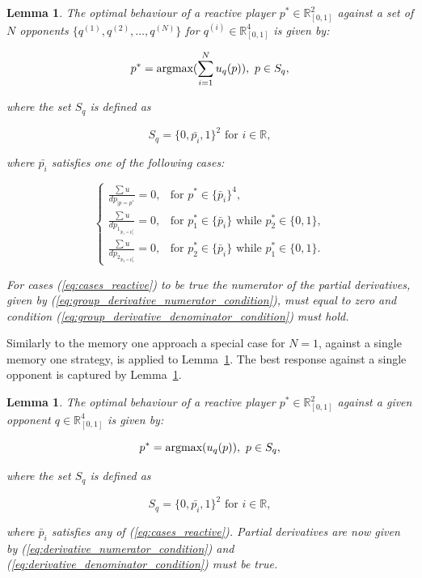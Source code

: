 \documentclass[10pt]{article}
\newcommand{\R}{\mathbb{R}}
\newtheorem{lemma}[theorem]{Lemma}
\begin{document}
\begin{lemma}\label{lemma:reactive_group_best_response}
    The optimal behaviour of a reactive player \(p^* \in \R_{[0, 1]} ^ 2\) against a set
    of \(N\) opponents \(\{q^{(1)}, q^{(2)}, \dots, q^{(N)} \}\) for \(q^{(i)} \in
    \R_{[0, 1]} ^ 4\) is given by:

    \[p^* = \textnormal{argmax}(\sum\limits_{i=1} ^ N  u_q(p)), \ p \in S_q,\]

    where the set \(S_q\) is defined as

    \[S_q = \{0, \bar{p_i}, 1 \} ^ 2 \text{ for } i \in \R,\]

    where \(\bar{p_i}\) satisfies one of the following cases:

    \begin{equation}\label{eq:cases_reactive}
        \left\{\begin{array}{lr}
        \frac{\sum u}{dp_{|p=p^*}} = 0, & \text{for } p^* \in \{\bar{p}_i\} ^ 4, \\
        \frac{\sum u}{dp_{1_{|p_1=p_1^*}}} = 0, & \text{for } p_1^* \in \{\bar{p}_i\}
        \text{ while } p_2 ^ * \in \{0, 1\},\\
        \frac{\sum u}{dp_{2_{|p_2=p_2^*}}} = 0, & \text{for } p_2^* \in \{\bar{p}_i\}
        \text{ while } p_1 ^ * \in \{0, 1\}.
        \end{array}\right.
    \end{equation}

    For cases (\ref{eq:cases_reactive}) to be true the numerator of the partial
    derivatives, given by (\ref{eq:group_derivative_numerator_condition}), must equal
    to zero and condition (\ref{eq:group_derivative_denominator_condition}) must hold.
\end{lemma}

Similarly to the memory one approach a special case for \(N=1\), against a single
memory one strategy, is applied to
Lemma~\ref{lemma:reactive_group_best_response}. The best response against a single
opponent is captured by Lemma~\ref{lemma:reactive_best_response}.

\begin{lemma}\label{lemma:reactive_best_response}
    The optimal behaviour of a reactive player \(p^* \in \R_{[0, 1]} ^ 2\) against a given
    opponent \(q \in \R_{[0, 1]} ^ 4\) is given by:

    \[p^* = \textnormal{argmax}(u_q(p)), \ p \in S_q,\]

    where the set \(S_q\) is defined as

    \[S_q = \{0, \bar{p_i}, 1 \} ^ 2 \text{ for } i \in \R,\]

    where \(\bar{p}_i\) satisfies any of (\ref{eq:cases_reactive}). Partial derivatives
    are now given by (\ref{eq:derivative_numerator_condition}) and
    (\ref{eq:derivative_denominator_condition}) must be true.
\end{lemma}
\end{document}

